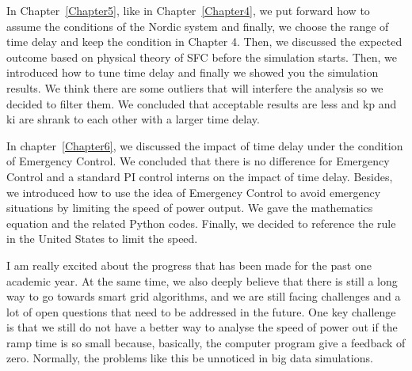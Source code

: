 In Chapter~\ref{Chapter5}, like in Chapter~\ref{Chapter4}, we put forward how to assume the conditions of the Nordic system and finally, we choose the range of time delay and keep the condition in Chapter 4. Then, we discussed the expected outcome based on physical theory of SFC before the simulation starts. Then, we introduced how to tune time delay and finally we showed you the simulation results. We think there are some outliers that will interfere the analysis so we decided to filter them. We concluded that acceptable results are less and kp and ki are shrank to each other with a larger time delay. 

In chapter~\ref{Chapter6}, we discussed the impact of time delay under the condition of  Emergency Control. We concluded that there is no difference for Emergency Control and a standard PI control interns on the impact of time delay. Besides, we introduced how to use the idea of Emergency Control to avoid emergency situations by limiting the speed of power output. We gave the mathematics equation and the related Python codes. Finally, we decided to reference the rule in the United States to limit the speed. 

I am really excited about the progress that has been made for the past one academic year. At the same time, we also deeply believe that there is still a long way to go towards smart grid algorithms, and we are still facing challenges and a lot of open questions that need to be addressed in the future. One key challenge is that we still do not have a better way to analyse the speed of power out if the ramp time is so small because, basically, the computer program give a feedback of zero. Normally, the problems like this be unnoticed in big data simulations. 